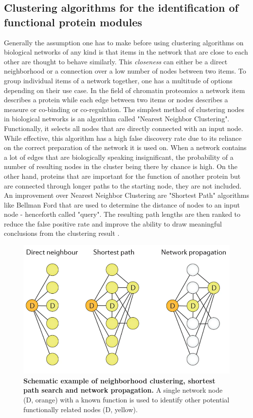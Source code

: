 \subsection{Clustering algorithms for the identification of functional protein modules}
\label{sec:diffusion}
Generally the assumption one has to make before using clustering algorithms on biological networks of any kind is that items in the network that are close to each other are thought to behave similarly. This \textit{closeness} can either be a direct neighborhood or a connection over a low number of nodes between two items. To group individual items of a network together, one has a multitude of options depending on their use case. In the field of chromatin proteomics a network item describes a protein while each edge between two items or nodes describes a measure or co-binding or co-regulation. The simplest method of clustering nodes in biological networks is an algorithm called "Nearest Neighbor Clustering". Functionally, it selects all nodes that are directly connected with an input node. While effective, this algorithm has a high false discovery rate due to its reliance on the correct preparation of the network it is used on. When a network contains a lot of edges that are biologically speaking insignificant, the probability of a number of resulting nodes in the cluster being there by chance is high. On the other hand, proteins that are important for the function of another protein but are connected through longer paths to the starting node, they are not included.\\
An improvement over Nearest Neighbor Clustering are "Shortest Path" algorithms like Bellman Ford that are used to determine the distance of nodes to an input node - henceforth called "query". The resulting path lengths are then ranked to reduce the false positive rate and improve the ability to draw meaningful conclusions from the clustering result \citep{Franke.2006}.
\begin{figure}[H]
    \centering
    \includegraphics[width=.6\textwidth]{resources/images/Intro/clustering_methods.PNG}
    \caption[Schematic example of neighborhood clustering, shortest path search and network propagation]{\textbf{Schematic example of neighborhood clustering, shortest path search and network propagation. }A single network node (D, orange) with a known function is used to identify other potential functionally related nodes (D, yellow).\\\citep{Cowen.2017}}
    \label{fig:clustering_methods}
\end{figure}
